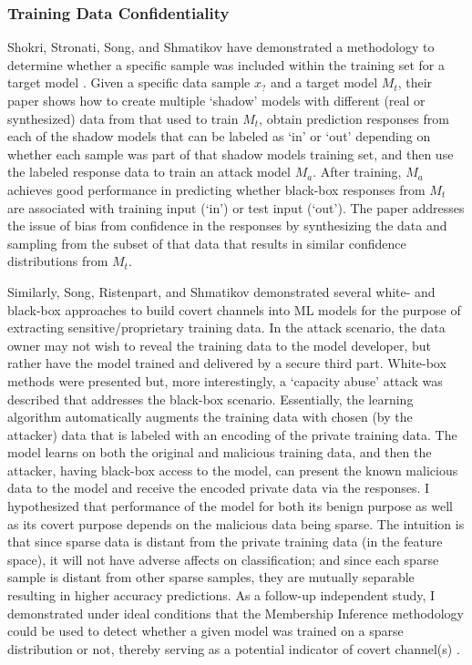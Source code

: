 \documentclass[11pt]{article}
\begin{document}
\subsubsection{Training Data Confidentiality}

Shokri, Stronati, Song, and Shmatikov have demonstrated a methodology to determine whether a specific sample was included within the training set for a target model \cite{shokri2017membership}.  Given a specific data sample $x_?$ and a target model $M_t$, their paper shows how to create multiple `shadow' models with different (real or synthesized) data from that used to train $M_t$, obtain prediction responses from each of the shadow models that can be labeled as `in' or `out' depending on whether each sample was part of that shadow models training set, and then use the labeled response data to train an attack model $M_a$.  After training, $M_a$ achieves good performance in predicting whether black-box responses from $M_t$ are associated with training input (`in') or test input (`out').  The paper addresses the issue of bias from confidence in the responses by synthesizing the data and sampling from the subset of that data that results in similar confidence distributions from $M_t$.

Similarly, Song, Ristenpart, and Shmatikov demonstrated several white- and black-box approaches to build covert channels into ML models for the purpose of extracting sensitive/proprietary training data.  In the attack scenario, the data owner may not wish to reveal the training data to the model developer, but rather have the model trained and delivered by a secure third part.  White-box methods were presented but, more interestingly, a `capacity abuse' attack was described that addresses the black-box scenario.  Essentially, the learning algorithm automatically augments the training data with chosen (by the attacker) data that is labeled with an encoding of the private training data.  The model learns on both the original and malicious training data, and then the attacker, having black-box access to the model, can present the known malicious data to the model and receive the encoded private data via the responses.  I hypothesized that performance of the model for both its benign purpose as well as its covert purpose depends on the malicious data being sparse.  The intuition is that since sparse data is distant  from the private training data (in the feature space), it will not have adverse affects on classification; and since each sparse sample is distant from other sparse samples, they are mutually separable resulting in higher accuracy predictions.  As a follow-up independent study, I demonstrated under ideal conditions that the Membership Inference \cite{shokri2017membership} methodology could be used to detect whether a given model was trained on a sparse distribution or not, thereby serving as a potential indicator of covert channel(s) \cite{stein2018covert}.
\end{document}
